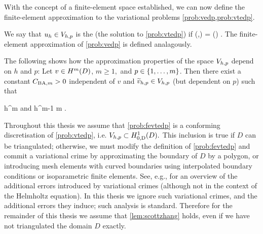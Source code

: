     With the concept of a finite-element space established, we can now define the finite-element approximation to the variational problems \cref{prob:vedp,prob:vtedp}.

    \label{prob:fevtedp}
    We say that $u_{h} \in V_{h,p}$ is the  (the solution to \cref{prob:vtedp}) if
    \beq\label{eq:fevtedp}
    \aT(\uh,\vh) = \LT(\vh) \tforall \vh \in \Vhp.
    \eeq
    The finite-element approximation of \cref{prob:vedp} is defined analagously.
    \eprob

    The following  shows how the approximation properties of the space $V_{h,p}$ depend on $h$ and $p$:
    \label{lem:scottzhang}
    Let $v \in \HmD$, $m \geq 1,$ and $p \in \set{1,\ldots,m}$. Then there exist a constant $C_{\mathrm{BA},m}>0$ independent of $v$ and $\widetilde{v}_{h,p} \in V_{h,p}$ (but dependent on $p$) such that

    \beqs
{} \leq \CSZm h^m 
    \eeqs
     and
    \beqs
{} \leq \CSZm h^{m-1}  \tfor m .
    \eeqs
    \ele

    
    \label{rem:crimes}
    Throughout this thesis we assume that \cref{prob:fevtedp} is a conforming discretisation of \cref{prob:vtedp}, i.e. $\Vhp \subset \HozDD.$ This inclusion is true if $D$ can be triangulated; otherwise, we must modify the definition of \cref{prob:fevtedp} and commit a variational crime by approximating the boundary of $D$ by a polygon, or introducing mesh elements with curved boundaries using interpolated boundary conditions or isoparametric finite elements. See, e.g., \cite[Chapter 10]{BrSc:08} for an overview of the additional errors introduced by variational crimes (although not in the context of the Helmholtz equation). In this thesis we  ignore such variational crimes, and the additional errors they induce; such analysis is standard. Therefore for the remainder of this thesis we assume that \cref{lem:scottzhang} holds, even if we have not triangulated the domain $D$ exactly.
    \ere
    



